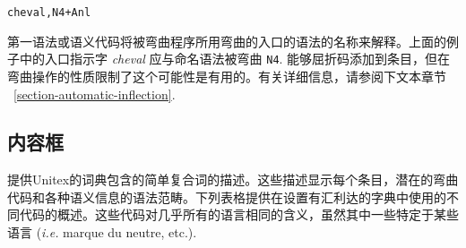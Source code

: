 \begin{verbatim}
cheval,N4+Anl
\end{verbatim}

\noindent 第一语法或语义代码将被弯曲程序所用弯曲的入口的语法的名称来解释。上面的例子中的入口指示字 \textit{cheval} 应与命名语法被弯曲 \verb+N4+.
能够屈折码添加到条目，但在弯曲操作的性质限制了这个可能性是有用的。有关详细信息，请参阅下文本章节 ~\ref{section-automatic-inflection}.


\subsection{内容框}

提供Unitex的词典包含的简单复合词的描述。这些描述显示每个条目，潜在的弯曲代码和各种语义信息的语法范畴。下列表格提供在设置有汇利达的字典中使用的不同代码的概述。这些代码对几乎所有的语言相同的含义，虽然其中一些特定于某些语言 (\textit{i.e.} marque du neutre, etc.).

